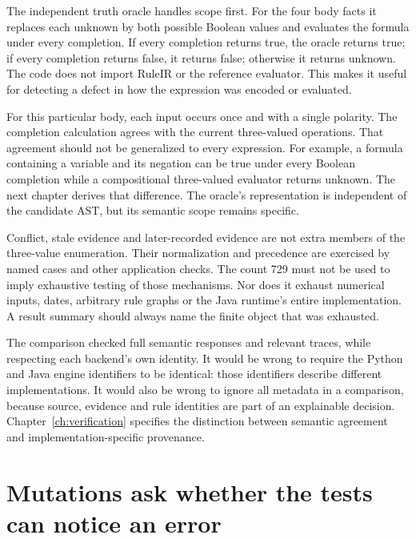 The independent truth oracle handles scope first. For the four body facts it
replaces each unknown by both possible Boolean values and evaluates the formula
under every completion. If every completion returns true, the oracle returns
true; if every completion returns false, it returns false; otherwise it returns
unknown. The code does not import RuleIR or the reference evaluator. This makes
it useful for detecting a defect in how the expression was encoded or evaluated.


For this particular body, each input occurs once and with a single polarity.
The completion calculation agrees with the current three-valued operations.
That agreement should not be generalized to every expression. For example, a
formula containing a variable and its negation can be true under every Boolean
completion while a compositional three-valued evaluator returns unknown. The
next chapter derives that difference. The oracle's representation is independent
of the candidate AST, but its semantic scope remains specific.

Conflict, stale evidence and later-recorded evidence are not extra members of
the three-value enumeration. Their normalization and precedence are exercised
by named cases and other application checks. The count 729 must not be used to
imply exhaustive testing of those mechanisms. Nor does it exhaust numerical
inputs, dates, arbitrary rule graphs or the Java runtime's entire implementation.
A result summary should always name the finite object that was exhausted.

The comparison checked full semantic responses and relevant traces, while
respecting each backend's own identity. It would be wrong to require the Python
and Java engine identifiers to be identical: those identifiers describe
different implementations. It would also be wrong to ignore all metadata in a
comparison, because source, evidence and rule identities are part of an
explainable decision. Chapter~\ref{ch:verification} specifies the distinction
between semantic agreement and implementation-specific provenance.

\section{Mutations ask whether the tests can notice an error}
\label{merge:M02:05}

